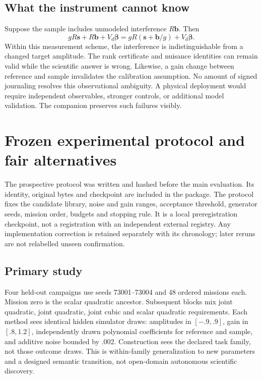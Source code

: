 \documentclass[11pt]{article}
\begin{document}
\subsection{What the instrument cannot know}

Suppose the sample includes unmodeled interference $R\mathbf b$. Then
\begin{equation}
gR\mathbf s+R\mathbf b+V_d\boldsymbol\beta
=gR(\mathbf s+\mathbf b/g)+V_d\boldsymbol\beta.
\label{eq:indistinguishable}
\end{equation}
Within this measurement scheme, the interference is indistinguishable from a changed target amplitude. The rank certificate and nuisance identities can remain valid while the scientific answer is wrong. Likewise, a gain change between reference and sample invalidates the calibration assumption. No amount of signed journaling resolves this observational ambiguity. A physical deployment would require independent observables, stronger controls, or additional model validation. The companion preserves such failures visibly.



\section{Frozen experimental protocol and fair alternatives}
\label{sec:protocol}

The prospective protocol was written and hashed before the main evaluation. Its identity, original bytes and checkpoint are included in the package. The protocol fixes the candidate library, noise and gain ranges, acceptance threshold, generator seeds, mission order, budgets and stopping rule. It is a local preregistration checkpoint, not a registration with an independent external registry. Any implementation correction is retained separately with its chronology; later reruns are not relabelled unseen confirmation.

\subsection{Primary study}

Four held-out campaigns use seeds 73001--73004 and 48 ordered missions each. Mission zero is the scalar quadratic ancestor. Subsequent blocks mix joint quadratic, joint quadratic, joint cubic and scalar quadratic requirements. Each method sees identical hidden simulator draws: amplitudes in $[-.9,.9]$, gain in $[.8,1.2]$, independently drawn polynomial coefficients for reference and sample, and additive noise bounded by .002. Construction sees the declared task family, not those outcome draws. This is within-family generalization to new parameters and a designed semantic transition, not open-domain autonomous scientific discovery.
\end{document}
